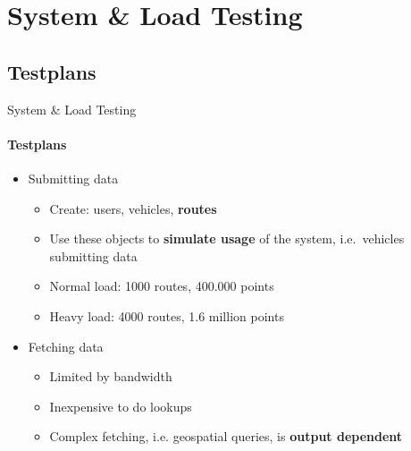 \section{System \& Load Testing}
\subsection{Testplans}

\begin{frame}{System \& Load Testing}
        \framesubtitle{Testplans}
        \begin{itemize}
            \item<1-> Submitting data
                \begin{itemize}
                    \item<1-> Create: users, vehicles, \textbf{routes}
                    \item<1-> Use these objects to \textbf{simulate usage} of the system, i.e.~vehicles submitting data
                    \item<1-> Normal load: 1000 routes, 400.000 points
                    \item<1-> Heavy load: 4000 routes, 1.6 million points
                \end{itemize}
            \item<2-> Fetching data
                \begin{itemize}
                    \item<2-> Limited by bandwidth
                    \item<2-> Inexpensive to do lookups
                    \item<2-> Complex fetching, i.e. geospatial queries, is \textbf{output dependent}
                \end{itemize}
        \end{itemize}
\end{frame}
